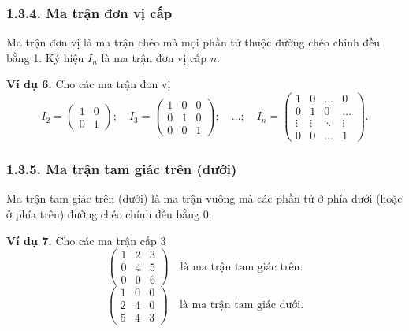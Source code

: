 \subsubsection*{1.3.4. Ma trận đơn vị cấp}
Ma trận đơn vị là ma trận chéo mà mọi phần tử thuộc đường chéo chính đều bằng 1. Ký hiệu \( I_n \) là ma trận đơn vị cấp \( n \).

\textbf{Ví dụ 6.} Cho các ma trận đơn vị
\[
I_2 = \begin{pmatrix}
1 & 0 \\
0 & 1
\end{pmatrix}
; \quad
I_3 = \begin{pmatrix}
1 & 0 & 0 \\
0 & 1 & 0 \\
0 & 0 & 1
\end{pmatrix}
; \quad \ldots; \quad
I_n = \begin{pmatrix}
1 & 0 & \ldots & 0 \\
0 & 1 & 0 & \ldots \\
\vdots & \vdots & \ddots & \vdots \\
0 & 0 & \ldots & 1
\end{pmatrix}
.
\]

\subsubsection*{1.3.5. Ma trận tam giác trên (dưới)}
Ma trận tam giác trên (dưới) là ma trận vuông mà các phần tử ở phía dưới (hoặc ở phía trên) đường chéo chính đều bằng 0.

\textbf{Ví dụ 7.} Cho các ma trận cấp 3
\[
\begin{pmatrix}
1 & 2 & 3 \\
0 & 4 & 5 \\
0 & 0 & 6
\end{pmatrix}
\quad \text{là ma trận tam giác trên.}
\]
\[
\begin{pmatrix}
1 & 0 & 0 \\
2 & 4 & 0 \\
5 & 4 & 3
\end{pmatrix}
\quad \text{là ma trận tam giác dưới.}
\]

